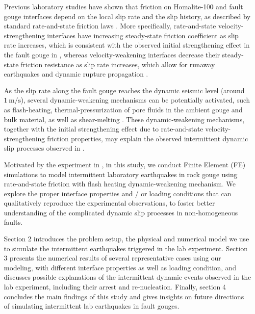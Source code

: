 \documentclass[final,a4paper]{elsarticle}
\begin{document}
Previous laboratory studies have shown that friction on Homalite-100 and fault gouge interfaces depend on the local slip rate and the slip history, 
as described by standard rate-and-state friction laws \cite{dieterich_modeling_1979, marone_laboratory-derived_1998}.
More specifically, 
rate-and-state velocity-strengthening interfaces have increasing steady-state friction coefficient as slip rate increases, 
which is consistent with the observed initial strengthening effect in the fault gouge in \cite{Rubino2022}, 
whereas velocity-weakening interfaces decrease their steady-state friction resistance as slip rate increases, 
which allow for runaway earthquakes and dynamic rupture propagation \cite{dieterich_modeling_1979, scholz_2019, rice_stability_1983}. 

As the slip rate along the fault gouge reaches the dynamic seismic level (around $1\ \mathrm{m/s}$), 
several dynamic-weakening mechanisms can be potentially activated, 
such as flash-heating, 
thermal-pressurization of pore fluids in the ambient gouge and bulk material, 
as well as shear-melting \cite{tsutsumi_high-velocity_1997, di_toro_friction_2004, beeler_constitutive_2008, tanikawa_frictional_2009, reches_fault_2010, faulkner_stuck_2011, goldsby_flash_2011, di_toro_fault_2011, kitajima_dynamic_2011, brown_melt_2012, proctor_dynamic_2014, boulton_high-velocity_2017, rowe_earthquake_2019, rice_heating_2006, noda_earthquake_2009}. 
These dynamic-weakening mechanisms, 
together with the initial strengthening effect due to rate-and-state velocity-strengthening friction properties, 
may explain the observed intermittent dynamic slip processes observed in \cite{Rubino2022}.

Motivated by the experiment in \cite{Rubino2022}, 
in this study, 
we conduct Finite Element (FE) simulations to model intermittent laboratory earthquakes in rock gouge using rate-and-state friction with flash heating dynamic-weakening mechanism. 
We explore the proper interface properties and / or loading conditions that can qualitatively reproduce the experimental observations, 
to foster better understanding of the complicated dynamic slip processes in non-homogeneous faults.

Section 2 introduces the problem setup, 
the physical and numerical model we use to simulate the intermittent earthquakes triggered in the lab experiment. 
Section 3 presents the numerical results of several representative cases using our modeling, 
with different interface properties as well as loading condition, 
and discusses possible explanations of the intermittent dynamic events observed in the lab experiment, 
including their arrest and re-nucleation. 
Finally, 
section 4 concludes the main findings of this study and gives insights on future directions of simulating intermittent lab earthquakes in fault gouges.
\end{document}

